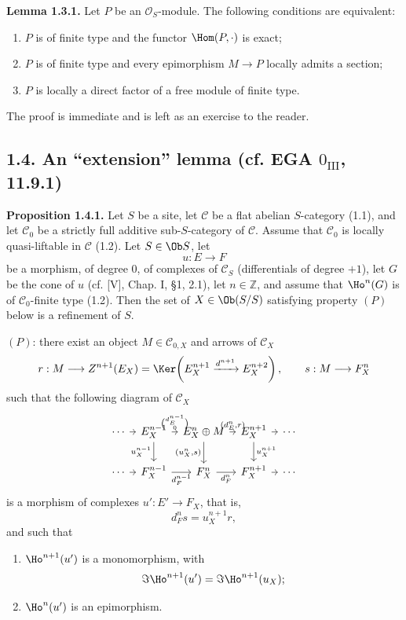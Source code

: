 \textbf{Lemma 1.3.1.} Let \(P\) be an \(\mathcal O_S\)-module. The following conditions are equivalent:
\begin{enumerate}[label=(\roman*)]
\item \(P\) is of finite type and the functor \(\Hom(P,\cdot)\) is exact;
\item \(P\) is of finite type and every epimorphism \(M\to P\) locally admits a section;
\item \(P\) is locally a direct factor of a free module of finite type.
\end{enumerate}
The proof is immediate and is left as an exercise to the reader.

\subsection*{1.4. An ``extension'' lemma (cf. EGA \(0_{\mathrm{III}}\), 11.9.1)}

\textbf{Proposition 1.4.1.} Let \(S\) be a site, let \(\mathcal C\) be a flat abelian \(S\)-category (1.1), and let \(\mathcal C_0\) be a strictly full additive sub-\(S\)-category of \(\mathcal C\). Assume that \(\mathcal C_0\) is locally quasi-liftable in \(\mathcal C\) (1.2). Let \(S\in\Ob S\), let
\[
  u:E\longrightarrow F
\]
be a morphism, of degree \(0\), of complexes of \(\mathcal C_S\) (differentials of degree \(+1\)), let \(G\) be the cone of \(u\) (cf. [V], Chap. I, §1, 2.1), let \(n\in\mathbb Z\), and assume that \(\Ho^n(G)\) is of \(\mathcal C_0\)-finite type (1.2). Then the set of \(X\in\Ob(S/S)\) satisfying property \((P)\) below is a refinement of \(S\).

\((P)\): there exist an object \(M\in\mathcal C_{0,X}\) and arrows of \(\mathcal C_X\)
\[
  r:M\longrightarrow Z^{n+1}(E_X)=
  \Ker\!\left(E_X^{n+1}\xrightarrow{d^{n+1}}E_X^{n+2}\right),
  \qquad
  s:M\longrightarrow F_X^n
\]
such that the following diagram of \(\mathcal C_X\)
\[
\begin{tikzcd}[column sep=tiny]
\cdots \arrow[r] & E_X^{n-1}
 \arrow[r,"{\binom{d_E^{n-1}}{0}}"]
 \arrow[d,"u_X^{n-1}"'] &
E_X^n\oplus M
 \arrow[r,"{(d_E^n,r)}"]
 \arrow[d,"{(u_X^n,s)}"'] &
E_X^{n+1} \arrow[r] \arrow[d,"u_X^{n+1}"] &
\cdots\\
\cdots \arrow[r] & F_X^{n-1} \arrow[r,"d_F^{n-1}"'] &
F_X^n \arrow[r,"d_F^n"'] &
F_X^{n+1} \arrow[r] &
\cdots
\end{tikzcd}
\]
is a morphism of complexes \(u':E'\to F_X\), that is,
\[
  d_F^n s=u_X^{n+1}r,
\]
and such that
\begin{enumerate}[label=(\roman*)]
\item \(\Ho^{n+1}(u')\) is a monomorphism, with
\[
  \Im\Ho^{n+1}(u')=\Im\Ho^{n+1}(u_X);
\]
\item \(\Ho^n(u')\) is an epimorphism.
\end{enumerate}


